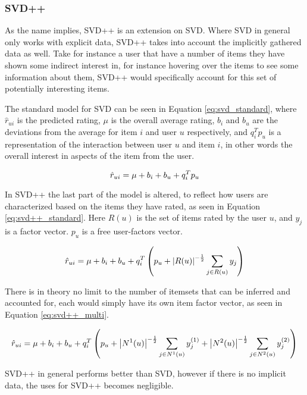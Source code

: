 \subsubsection{SVD++} \label{bg:mf_svd++}
As the name implies, SVD++ is an extension on SVD. Where SVD in general only works with explicit data, SVD++ takes into account the implicitly gathered data as well. Take for instance a user that have a number of items they have shown some indirect interest in, for instance hovering over the items to see some information about them, SVD++ would specifically account for this set of potentially interesting items.


 
The standard model for SVD can be seen in Equation \ref{eq:svd_standard}, where $\hat{r}_{ui}$ is the predicted rating, $\mu$ is the overall average rating, $b_{i}$ and $b_{u}$ are the deviations from the average for item $i$ and user $u$ respectively, and $q_{i}^{T}p_{u}$ is a representation of the interaction between user $u$ and item $i$, in other words the overall interest in aspects of the item from the user.

\begin{equation} \label{eq:svd_standard}
\centering
\hat{r}_{ui} = \mu + b_{i} + b_{u} + q_{i}^{T}p_{u}
\end{equation}

In SVD++ the last part of the model is altered, to reflect how users are characterized based on the items they have rated, as seen in Equation \ref{eq:svd++_standard}. Here $R(u)$ is the set of items rated by the user $u$, and $y_{j}$ is a factor vector. $p_{u}$ is a free user-factors vector.

\begin{equation} \label{eq:svd++_standard}
\centering
\hat{r}_{ui} = \mu + b_{i} + b_{u} + q_{i}^{T}\left (p_{u} + \left | R(u) \right |^{-\frac{1}{2}} \sum_{j\in R(u)} y_{j} \right )
\end{equation}

There is in theory no limit to the number of itemsets that can be inferred and accounted for, each would simply have its own item factor vector, as seen in Equation \ref{eq:svd++_multi}.

\begin{equation} \label{eq:svd++_multi}
\centering
\hat{r}_{ui} = \mu + b_{i} + b_{u} + q_{i}^{T}\left (p_{u} + \left | N^{1}(u) \right |^{-\frac{1}{2}} \sum_{j\in N^{1}(u)} y_{j}^{(1)} + \left | N^{2}(u) \right |^{-\frac{1}{2}} \sum_{j\in N^{2}(u)} y_{j}^{(2)} \right )
\end{equation}

SVD++ in general performs better than SVD, however if there is no implicit data, the uses for SVD++ becomes negligible.